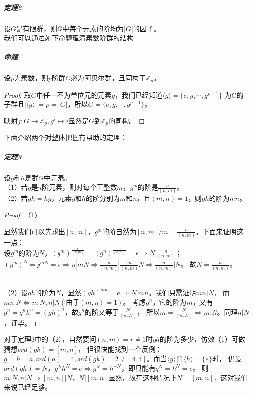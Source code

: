 \documentclass{article}
\begin{document}
\subparagraph{定理2} 设$G$是有限群，则$G$中每个元素的阶均为$|G|$的因子。\\

我们可以通过如下命题理清素数阶群的结构：

\subparagraph{命题} 设$p$为素数，则$p$阶群$G$必为阿贝尔群，且同构于$\mathbb{Z}_p$。

\begin{proof}
    取$G$中任一不为单位元的元素$g$，我们已经知道$\langle g \rangle=\{ e,g,\cdots,g^{p-1}\}$
    为$G$的子群且$|\langle g \rangle|=p=|G|$，所以$G=\{ e,g,\cdots,g^{p-1} \}$。

    映射$f:G \to \mathbb{Z}_p, g^i \mapsto i$显然是$G$到$\mathbb{Z}_p$的同构。
\end{proof}

下面介绍两个对整体把握有帮助的定理：
\subparagraph{定理3} 设$g$和$h$是群$G$中元素。\\
（1）若$g$是$n$阶元素，则对每个正整数$m$，$g^m$的阶是$\frac{n}{(n,m)}$。\\
（2）若$gh=hg$，元素$g$和$h$的阶分别为$m$和$n$，且$(m,n)=1$，则$gh$的阶为$mn$。
\begin{proof}
    （1）\\
    \begin{center}
    \end{center}

    显然我们可以先求出$[n,m]$，$g^m$的阶自然为$[n,m]/m=\frac{n}{(n,m)}$。下面来证明这一点：\\
    设$g^m$的阶为$N$，$(g^m)^{\frac{n}{(n,m)}}=(g^n)^{\frac{m}{(n,m)}}=e \Rightarrow N|\frac{n}{(n,m)}$；
    $(g^m)^N=g^{mN}=e \Rightarrow n|mN \Rightarrow \frac{n}{(n,m)}|\frac{m}{(n,m)}N \Rightarrow \frac{n}{(n,m)}|N$。
    故$N=\frac{n}{(n,m)}$。

    ~\\
    （2）设$gh$的阶为$N$，显然$(gh)^{mn}=e \Rightarrow N|mn$。我们只需证明$mn|N$，
    而$mn|N \Leftrightarrow m|N,n|N(\text{由于}(m,n)=1)$。
    考虑$g^n$，它的阶为$m$，又有$g^n=g^nh^n=(gh)^n$，故$g^n$的阶又等于$\frac{N}{(n,N)}$，
    所以$m=\frac{N}{(n,N)} \Rightarrow m|N$。同理$n|N$，证毕。
\end{proof}

对于定理3中的（2），自然要问$(n,m)=r \neq 1$时$gh$的阶为多少，仿效（1）可做猜想$ord(gh)=[m,n]$，
但很快能找到一个反例：$g=h=a,ord(a)=4,ord(gh)=2 \neq [4,4]$。而当$\langle g \rangle \bigcap \langle h \rangle = \{e\}$时，
仍设$ord(gh)=N$，$g^Nh^N=e \Rightarrow g^N = h^{-N}$，即只能有$g^N=h^N=e$。
则$m|N, n|N \Rightarrow [m,n]|N$，$N|[m,n]$显然，故在这种情况下$N=[m,n]$，这对我们来说已经足够。
\end{document}
